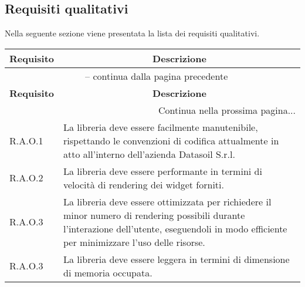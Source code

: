 \subsection{Requisiti qualitativi}
Nella seguente sezione viene presentata la lista dei requisiti qualitativi.

\begin{center}
    \begin{longtable}{|p{2.5cm}|p{10cm}|}
        \hline
        \rowcolor{gray!30}
        \textbf{Requisito} & \multicolumn{1}{c|}{\textbf{Descrizione}}                                                                                    \\
        \hline
        \endfirsthead
        \hline
        \multicolumn{2}{|c|}{{\tablename\ \thetable{} -- continua dalla pagina precedente}}                                                               \\
        \hline
        \rowcolor{gray!30}
        \textbf{Requisito} & \multicolumn{1}{c|}{\textbf{Descrizione}}                                                                                    \\
        \endhead
        \hline
        \multicolumn{2}{|r|}{{Continua nella prossima pagina...}}                                                                                         \\
        \hline
        \endfoot
        \hline
        \endlastfoot
        \hline
        R.A.O.1            & La libreria deve essere facilmente manutenibile, rispettando le convenzioni di codifica
        attualmente in atto all'interno dell'azienda Datasoil S.r.l.                                                                                      \\
        \hline
        R.A.O.2            & La libreria deve essere performante in termini di velocità di rendering dei widget forniti.                                  \\
        \hline
        R.A.O.3            & La libreria deve essere ottimizzata per richiedere il minor numero di rendering possibili durante l'interazione dell'utente,
        eseguendoli in modo efficiente per minimizzare l'uso delle risorse.                                                                               \\
        \hline
        R.A.O.3            & La libreria deve essere leggera in termini di dimensione di memoria occupata.                                                \\

\end{longtable}
\end{center}
